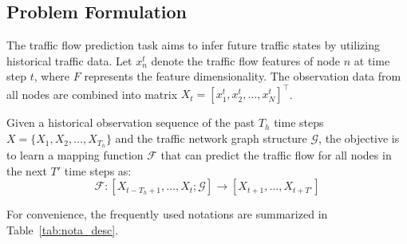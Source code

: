\documentclass[5p,times,authoryear]{elsarticle}
\begin{document}
\subsection{Problem Formulation}
The traffic flow prediction task aims to infer future traffic states by utilizing historical traffic data. Let $x_n^t$ denote the traffic flow features of node $n$ at time step $t$, where $F$ represents the feature dimensionality. The observation data from all nodes are combined into matrix $X_t = [x_1^t, x_2^t, \ldots, x_N^t]^\top$.

Given a historical observation sequence of the past $T_h$ time steps $X = \{X_1, X_2, \ldots, X_{T_h} \}$ and the traffic network graph structure $\mathcal{G}$, the objective is to learn a mapping function $\mathcal{F}$ that can predict the traffic flow for all nodes in the next $T'$ time steps as:
\begin{equation}
\label{eq:problem_formulation}
\mathcal{F}: \left[ X_{t-T_h+1}, \ldots, X_t; \mathcal{G} \right] \rightarrow \left[ X_{t+1}, \ldots, X_{t+T'} \right]
\end{equation}

For convenience, the frequently used notations are summarized in Table~\ref{tab:nota_desc}.




\end{document}
